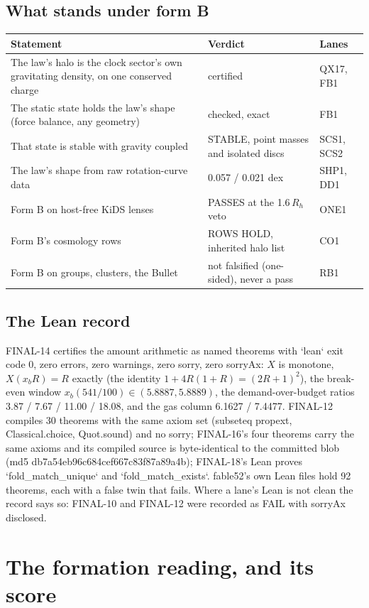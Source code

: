 \documentclass[10pt]{article}
\begin{document}
\subsection{What stands under form B}
{\small
\begin{longtable}{@{}p{}p{}p{}@{}}
\toprule
Statement & Verdict & Lanes\\\midrule
\endhead
The law's halo is the clock sector's own gravitating density, on one conserved charge & certified & QX17, FB1\\
The static state holds the law's shape (force balance, any geometry) & checked, exact & FB1\\
That state is stable with gravity coupled & STABLE, point masses and isolated discs & SCS1, SCS2\\
The law's shape from raw rotation-curve data & 0.057 / 0.021 dex & SHP1, DD1\\
Form B on host-free KiDS lenses & PASSES at the 1.6\,$R_h$ veto & ONE1\\
Form B's cosmology rows & ROWS HOLD, inherited halo list & CO1\\
Form B on groups, clusters, the Bullet & not falsified (one-sided), never a pass & RB1\\
\bottomrule
\end{longtable}}

\subsection{The Lean record}
FINAL-14 certifies the amount arithmetic as named theorems with `lean` exit code 0, zero errors, zero warnings,
zero sorry, zero sorryAx: $X$ is monotone, $X(x_bR)=R$ exactly (the identity $1+4R(1+R)=(2R+1)^2$), the
break-even window $x_b(541/100)\in(5.8887,5.8889)$, the demand-over-budget ratios 3.87 / 7.67 / 11.00 / 18.08,
and the gas column 6.1627 / 7.4477. FINAL-12 compiles 30 theorems with the same axiom set
(subseteq propext, Classical.choice, Quot.sound) and no sorry; FINAL-16's four theorems carry the same axioms and
its compiled source is byte-identical to the committed blob (md5 db7a54eb96c684cef667c83f87a89a4b); FINAL-18's
Lean proves `fold\_match\_unique` and `fold\_match\_exists`. fable52's own Lean files hold 92 theorems, each with a
false twin that fails. Where a lane's Lean is not clean the record says so: FINAL-10 and FINAL-12 were recorded
as FAIL with sorryAx disclosed.

\section{The formation reading, and its score}
\label{sec:formation}
\end{document}
